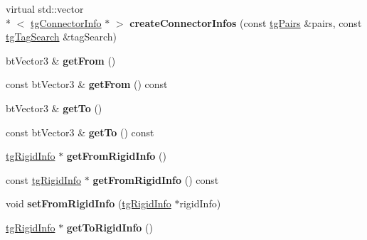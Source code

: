 \begin{DoxyCompactItemize}
\item 
\hypertarget{classtg_connector_info_af37c4e90660799cf6ef81528cdd39940}{virtual std\-::vector\\*
$<$ \hyperlink{classtg_connector_info}{tg\-Connector\-Info} $\ast$ $>$ {\bfseries create\-Connector\-Infos} (const \hyperlink{classtg_pairs}{tg\-Pairs} \&pairs, const \hyperlink{classtg_tag_search}{tg\-Tag\-Search} \&tag\-Search)}\label{classtg_connector_info_af37c4e90660799cf6ef81528cdd39940}

\item 
\hypertarget{classtg_connector_info_aa65e2729137e9fbbbfbfebdc6d372b48}{bt\-Vector3 \& {\bfseries get\-From} ()}\label{classtg_connector_info_aa65e2729137e9fbbbfbfebdc6d372b48}

\item 
\hypertarget{classtg_connector_info_abab475f1c1d7fe79bceda405a61c4a19}{const bt\-Vector3 \& {\bfseries get\-From} () const }\label{classtg_connector_info_abab475f1c1d7fe79bceda405a61c4a19}

\item 
\hypertarget{classtg_connector_info_a456cd53ce4b53f5690cd61136822cef2}{bt\-Vector3 \& {\bfseries get\-To} ()}\label{classtg_connector_info_a456cd53ce4b53f5690cd61136822cef2}

\item 
\hypertarget{classtg_connector_info_aff647fffb7c06cc9656fa2ba81f760db}{const bt\-Vector3 \& {\bfseries get\-To} () const }\label{classtg_connector_info_aff647fffb7c06cc9656fa2ba81f760db}

\item 
\hypertarget{classtg_connector_info_aaf9d671e6501b1faf18539fee60ca3d9}{\hyperlink{classtg_rigid_info}{tg\-Rigid\-Info} $\ast$ {\bfseries get\-From\-Rigid\-Info} ()}\label{classtg_connector_info_aaf9d671e6501b1faf18539fee60ca3d9}

\item 
\hypertarget{classtg_connector_info_aa4d1634d99c160ffdfbb6f927cdd94cd}{const \hyperlink{classtg_rigid_info}{tg\-Rigid\-Info} $\ast$ {\bfseries get\-From\-Rigid\-Info} () const }\label{classtg_connector_info_aa4d1634d99c160ffdfbb6f927cdd94cd}

\item 
\hypertarget{classtg_connector_info_a04310aef0b90090fc541ca33523e4254}{void {\bfseries set\-From\-Rigid\-Info} (\hyperlink{classtg_rigid_info}{tg\-Rigid\-Info} $\ast$rigid\-Info)}\label{classtg_connector_info_a04310aef0b90090fc541ca33523e4254}

\item 
\hypertarget{classtg_connector_info_aef4d585bd515733b8160a0899ca2f7a5}{\hyperlink{classtg_rigid_info}{tg\-Rigid\-Info} $\ast$ {\bfseries get\-To\-Rigid\-Info} ()}\label{classtg_connector_info_aef4d585bd515733b8160a0899ca2f7a5}


\end{DoxyCompactItemize}
